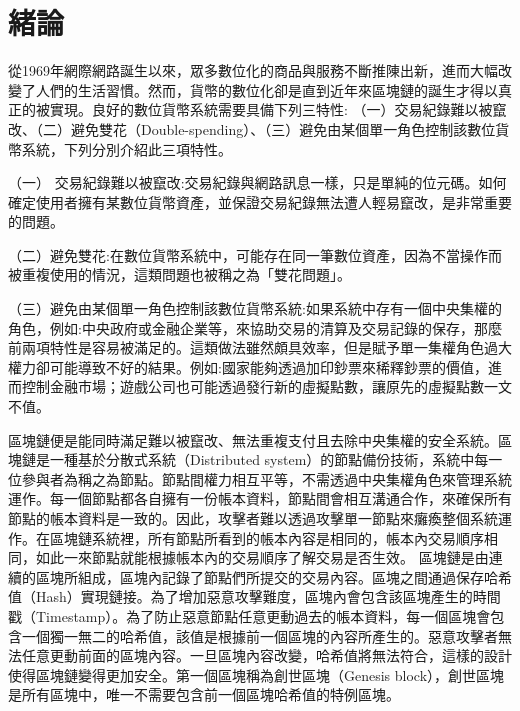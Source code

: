 \chapter{緒論}
從1969年網際網路誕生以來，眾多數位化的商品與服務不斷推陳出新，進而大幅改變了人們的生活習慣。然而，貨幣的數位化卻是直到近年來區塊鏈的誕生才得以真正的被實現。良好的數位貨幣系統需要具備下列三特性:
（一）交易紀錄難以被竄改、（二）避免雙花（Double-spending）、（三）避免由某個單一角色控制該數位貨幣系統，下列分別介紹此三項特性。

（一） 交易紀錄難以被竄改:交易紀錄與網路訊息一樣，只是單純的位元碼。如何確定使用者擁有某數位貨幣資產，並保證交易紀錄無法遭人輕易竄改，是非常重要的問題。

（二）避免雙花:在數位貨幣系統中，可能存在同一筆數位資產，因為不當操作而被重複使用的情況，這類問題也被稱之為「雙花問題」。

（三）避免由某個單一角色控制該數位貨幣系統:如果系統中存有一個中央集權的角色，例如:中央政府或金融企業等，來協助交易的清算及交易記錄的保存，那麼前兩項特性是容易被滿足的。這類做法雖然頗具效率，但是賦予單一集權角色過大權力卻可能導致不好的結果。例如:國家能夠透過加印鈔票來稀釋鈔票的價值，進而控制金融市場；遊戲公司也可能透過發行新的虛擬點數，讓原先的虛擬點數一文不值。

區塊鏈便是能同時滿足難以被竄改、無法重複支付且去除中央集權的安全系統。區塊鏈是一種基於分散式系統（Distributed system）的節點備份技術，系統中每一位參與者為稱之為節點。節點間權力相互平等，不需透過中央集權角色來管理系統運作。每一個節點都各自擁有一份帳本資料，節點間會相互溝通合作，來確保所有節點的帳本資料是一致的。因此，攻擊者難以透過攻擊單一節點來癱瘓整個系統運作。在區塊鏈系統裡，所有節點所看到的帳本內容是相同的，帳本內交易順序相同，如此一來節點就能根據帳本內的交易順序了解交易是否生效。
區塊鏈是由連續的區塊所組成，區塊內記錄了節點們所提交的交易內容。區塊之間通過保存哈希值（Hash）實現鏈接。為了增加惡意攻擊難度，區塊內會包含該區塊產生的時間戳（Timestamp）。為了防止惡意節點任意更動過去的帳本資料，每一個區塊會包含一個獨一無二的哈希值，該值是根據前一個區塊的內容所產生的。惡意攻擊者無法任意更動前面的區塊內容。一旦區塊內容改變，哈希值將無法符合，這樣的設計使得區塊鏈變得更加安全。第一個區塊稱為創世區塊（Genesis block），創世區塊是所有區塊中，唯一不需要包含前一個區塊哈希值的特例區塊。


